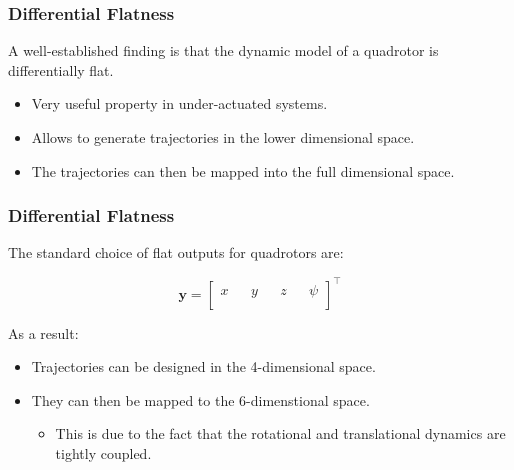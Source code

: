 \documentclass{thesisbeamer}
\newcommand\Fontvi{\fontsize{9}{10}\selectfont}
\begin{document}
\begin{frame}
	\frametitle{Differential Flatness}
	\Fontvi	

	A well-established finding is that the dynamic model of a quadrotor is differentially flat.
	\begin{itemize}
	

% 
	
	
	 \item Very useful property in under-actuated systems.
	 \item Allows to generate trajectories in the lower dimensional space.
	 \item The trajectories can then be mapped into the full dimensional space.
	\end{itemize}

\end{frame}


\begin{frame}
	\frametitle{Differential Flatness}
	\Fontvi
	
	The standard choice of flat outputs for quadrotors are:

\begin{equation}\label{flat_outputs}
\textbf{y} = \begin{bmatrix}
x && y && z && \psi \\
\end{bmatrix}^{\intercal}
\end{equation}

As a result:
\begin{itemize}
	\item Trajectories can be designed in the 4-dimensional space.
	\item They can then be mapped to the 6-dimenstional space.
	\begin{itemize}
		\item \fontsize{9pt}{10pt}\selectfont This is due to the fact that the rotational and translational dynamics are tightly coupled.
	\end{itemize}			
\end{itemize}

\end{frame}
\end{document}
